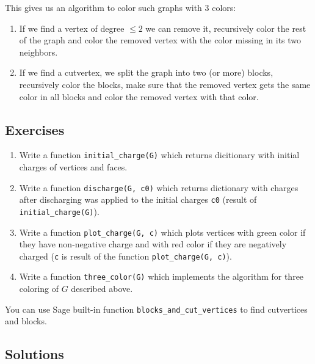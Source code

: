 This gives us an algorithm to color such graphs with 3 colors:
\begin{enumerate}
\item If we find a vertex of degree $\leq 2$ we can remove it, recursively color the rest of the graph and color the removed vertex with the color missing in its two neighbors.
\item If we find a cutvertex, we split the graph into two (or more) blocks, recursively color the blocks, make sure that the removed vertex gets the same color in all blocks and color the removed vertex with that color.
\end{enumerate}

\subsection{Exercises}

\begin{enumerate}
    \item Write a function \verb|initial_charge(G)| which returns dicitionary with initial charges of vertices and faces.
    \item Write a function \verb|discharge(G, c0)| which returns dictionary with charges after discharging was applied to the initial charges \verb|c0| (result of \verb|initial_charge(G)|).
    \item Write a function \verb|plot_charge(G, c)| which plots vertices with green color if they have non-negative charge and with red color if they are negatively charged (\verb|c| is result of the function \verb|plot_charge(G, c)|).
    \item Write a function \verb|three_color(G)| which implements the algorithm for three coloring of $G$ described above.
\end{enumerate}
You can use Sage built-in function \verb|blocks_and_cut_vertices| to find cutvertices and blocks.

\subsection*{Solutions}

